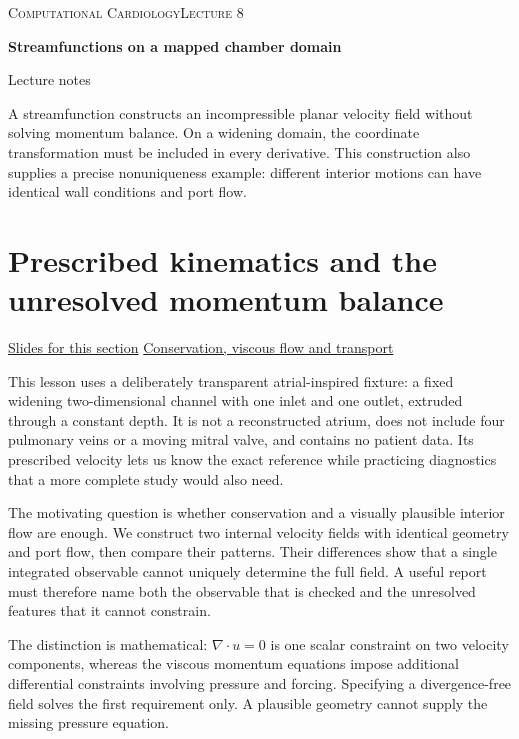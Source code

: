 \documentclass[11pt,letterpaper]{article}
\theoremstyle{definition}\newtheorem{definition}{Definition}\newtheorem{example}{Example}
\numberwithin{equation}{section}
\begin{document}
{\small\scshape Computational Cardiology\hfill Lecture 8}\par\medskip
{\raggedright{}\LARGE\bfseries\color{ink} Streamfunctions on a mapped chamber domain\par}\medskip
{\small Lecture notes}\par\bigskip
A streamfunction constructs an incompressible planar velocity field without solving momentum balance. On a widening domain, the coordinate transformation must be included in every derivative. This construction also supplies a precise nonuniqueness example: different interior motions can have identical wall conditions and port flow.

\section{Prescribed kinematics and the unresolved momentum balance}
\hypertarget{note-prescribed-kinematics-and-the-unresolved-momentum-balance}{}\label{note:prescribed-kinematics-and-the-unresolved-momentum-balance}
{\small \href{slides.html\#frame=incompressibility-as-a-kinematic-constraint\&step=1}{Slides for this section} \quad \href{../modules/cfd/index.html}{Conservation, viscous flow and transport}}\par
This lesson uses a deliberately transparent atrial-inspired fixture: a fixed widening two-dimensional channel with one inlet and one outlet, extruded through a constant depth. It is not a reconstructed atrium, does not include four pulmonary veins or a moving mitral valve, and contains no patient data. Its prescribed velocity lets us know the exact reference while practicing diagnostics that a more complete study would also need.

The motivating question is whether conservation and a visually plausible interior flow are enough. We construct two internal velocity fields with identical geometry and port flow, then compare their patterns. Their differences show that a single integrated observable cannot uniquely determine the full field. A useful report must therefore name both the observable that is checked and the unresolved features that it cannot constrain.

The distinction is mathematical: $\nabla\cdot u=0$ is one scalar constraint on two velocity components, whereas the viscous momentum equations impose additional differential constraints involving pressure and forcing. Specifying a divergence-free field solves the first requirement only. A plausible geometry cannot supply the missing pressure equation.
\end{document}
